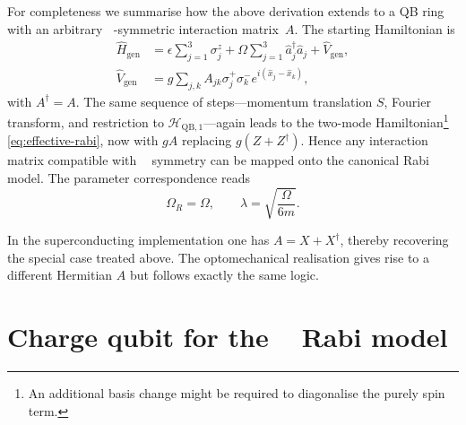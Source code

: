 \documentclass[reprint, aps, prx, amsmath, amssymb, longbibliography, superscriptaddress]{revtex4-2}
\DeclareMathOperator{\Zthree}{\mathbb{Z}_3}
\begin{document}
For completeness we summarise how the above derivation extends to a QB ring
with an arbitrary $\Zthree$-symmetric interaction matrix~$A$.  The starting
Hamiltonian is
\begin{equation}
\label{eq:arbitary-interaction-hamiltonian}
  \begin{aligned}
    \hat H_{\text{gen}} &= \epsilon \sum_{j=1}^{3} \sigma_j^z
      + \Omega \sum_{j=1}^{3} \hat a_j^{\dagger} \hat a_j + \hat V_{\text{gen}},
      \\
    \hat V_{\text{gen}} &= g \sum_{j,k} A_{jk}
      \sigma_j^{+} \sigma_k^{-} e^{ i ( \hat x_j - \hat x_k ) },
  \end{aligned}
\end{equation}
with $A^{\dagger}=A$.  The same sequence of steps---momentum translation $S$,
Fourier transform, and restriction to $\mathcal H_{\text{QB},1}$---again leads
to the two-mode Hamiltonian\footnote{An additional basis change might be
required to diagonalise the purely spin term.}
\eqref{eq:effective-rabi}, now with $gA$ replacing $g(Z+Z^{\dagger})$.  Hence any
interaction matrix compatible with $\Zthree$ symmetry can be mapped onto the
canonical Rabi model.  The parameter correspondence reads
\begin{equation}
  \Omega_R = \Omega, \qquad \lambda = \sqrt{ \frac{\Omega}{6 m} }.
\end{equation}

In the superconducting implementation one has $A = X + X^{\dagger}$, thereby
recovering the special case treated above.  The optomechanical realisation
gives rise to a different Hermitian $A$ but follows exactly the same logic.





\section{Charge qubit for the \texorpdfstring{$\Zthree$}{Z3} Rabi model}
\label{app:charge-qubit}
\end{document}
